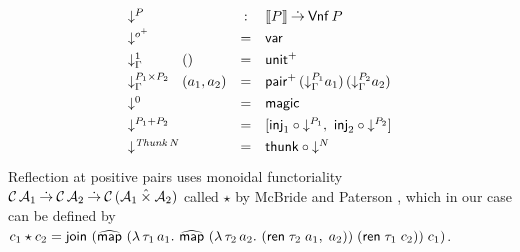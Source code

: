 \documentclass[sigconf,screen,fleqn]{acmart} %
\begin{document}
\[
\def\arraystretch{1.3}
\begin{array}{l@{\,}lcl}
    \multicolumn 2 l {\down P} & : & \den P \todot \tVNf\,P \\
  \down {\patom} & & = & \tvar \\
  \downG {\tyone} & () & = & \punit \\
  \downG {P_1 \times P_2} & (a_1,a_2) & = & \ppair
    \,(\downG {P_1} a_1)
    \,(\downG {P_2} a_2)
    \\
  \down {\tyzero} & & = & \tmagic \\
  \down {P_1 + P_2} & & = &
    [  \tinj_1 \comp \down{P_1}
    ,\ \tinj_2 \comp \down{P_2}
    ] \\
  \down {\Thunk N} & & = & \tthunk \circ \down N \\
\end{array}
\]
Reflection at positive pairs uses monoidal functoriality
$\mathcal{C}\,\mathcal{A}_1 \mathbin{\dot{\to}} \mathcal{C}\,\mathcal{A}_2 \mathbin{\dot{\to}} \mathcal{C}\,(\mathcal{A}_1 \mathbin{\hat\times} \mathcal{A}_2)$
called $\star$ by McBride and Paterson \cite[Section 7]{mcbridePaterson:applicative},
which in our case can be defined by \eg\
$c_1 \star c_2 =
   \mathsf{join}^{} \; (\widehat{\mathsf{map}}^{}\;(\lambda\,\tau_1\,a_1.\
   \widehat{\mathsf{map}}^{}\;(\lambda\,\tau_2\,a_2.\ (\mathsf{ren}\;\tau_2\;a_1,\;a_2))
    \;(\mathsf{ren}\;\tau_1\;c_2))
    \;c_1)$.

\end{document}
